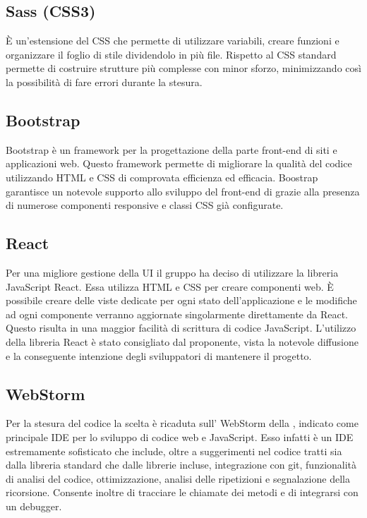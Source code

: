 \subsection{Sass (CSS3)}
È un'estensione del CSS che permette di utilizzare variabili, creare funzioni e organizzare il foglio di stile dividendolo in più file. Rispetto al CSS standard permette di costruire strutture più complesse con minor sforzo, minimizzando così la possibilità di fare errori durante la stesura.

\subsection{Bootstrap}
Bootstrap è un framework per la progettazione della parte front-end di siti e applicazioni web. Questo framework permette di migliorare la qualità del codice utilizzando  HTML e CSS di comprovata efficienza ed efficacia. Boostrap garantisce un notevole supporto allo sviluppo del front-end di \ProjectName{} grazie alla presenza di numerose componenti responsive e classi CSS già configurate.

\subsection{React}
Per una migliore gestione della UI il gruppo ha deciso di utilizzare la libreria JavaScript React. Essa utilizza HTML e CSS per creare componenti web. È possibile creare delle viste dedicate per ogni stato dell'applicazione e le modifiche ad ogni componente verranno aggiornate singolarmente direttamente da React. Questo risulta in una maggior facilità di scrittura di codice JavaScript. L'utilizzo della libreria React è stato consigliato dal proponente, vista la notevole diffusione e la conseguente intenzione degli sviluppatori di mantenere il progetto.

\subsection{WebStorm}
Per la stesura del codice la scelta è ricaduta sull' WebStorm della , indicato come principale IDE per lo sviluppo di codice web e JavaScript. Esso infatti è un IDE estremamente sofisticato che include, oltre a suggerimenti nel codice tratti sia dalla libreria standard che dalle librerie incluse, integrazione con git, funzionalità di analisi del codice, ottimizzazione, analisi delle ripetizioni e segnalazione della ricorsione. Consente inoltre di tracciare le chiamate dei metodi e di integrarsi con un debugger.